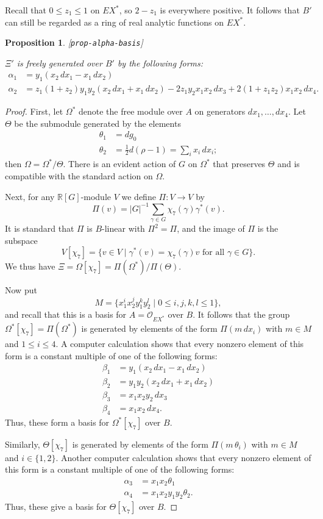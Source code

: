 \documentclass[reqno]{amsart}
\newcommand{\lbl}[1]{\label{#1}\textup{[\texttt{#1}]}\par}
\newcommand{\lbl}{\label}
\newcommand{\Tht}       {\Theta}
\newcommand{\Om}        {\Omega}
\newcommand{\al}        {\alpha}
\newcommand{\bt}        {\beta}
\newcommand{\gm}        {\gamma}
\newcommand{\tht}       {\theta}
\newcommand{\R}         {{\mathbb{R}}}
\newcommand{\st}        {\;|\;}
\newcommand{\half}      {\tfrac{1}{2}}
\newcommand{\CO}        {\mathcal{O}}
\renewcommand{\:}{\colon}
\newtheorem{proposition}[theorem]{Proposition}
\theoremstyle{definition}
\begin{document}
Recall that $0\leq z_1\leq 1$ on $EX^*$, so $2-z_1$ is everywhere
positive.  It follows that $B'$ can still be regarded as a ring of
real analytic functions on $EX^*$.

\begin{proposition}\lbl{prop-alpha-basis}
 $\Xi'$ is freely generated over $B'$ by the following forms:
 \begin{align*}
  \al_1 &= y_1(x_2\,dx_1-x_1\,dx_2) \\
  \al_2 &= z_1(1+z_2)y_1y_2(x_2\,dx_1+x_1\,dx_2)
            -2z_1y_2x_1x_2\,dx_3 + 2(1+z_1z_2)x_1x_2\,dx_4.
 \end{align*}
\end{proposition}
\begin{proof}
 First, let $\Om^*$ denote the free module over $A$ on generators
 $dx_1,\dotsc,dx_4$.  Let $\Tht$ be the submodule generated by the
 elements
 \begin{align*}
  \tht_1 &= dg_0 \\
  \tht_2 &= \half d(\rho-1) = \sum_ix_i\,dx_i;
 \end{align*}
 then $\Om=\Om^*/\Tht$.  There is an evident action of $G$ on $\Om^*$
 that preserves $\Tht$ and is compatible with the standard action on
 $\Om$.

 Next, for any $\R[G]$-module $V$ we define $\Pi\:V\to V$ by
 \[ \Pi(v)=|G|^{-1}\sum_{\gm\in G} \chi_7(\gm)\gm^*(v). \]
 It is standard that $\Pi$ is $B$-linear with $\Pi^2=\Pi$, and the
 image of $\Pi$ is the subspace
 \[ V[\chi_7] = \{v\in V\st \gm^*(v)  = \chi_7(\gm)v
                   \text{ for all } \gm\in G\}.
 \]
 We thus have $\Xi=\Om[\chi_7]=\Pi(\Om^*)/\Pi(\Tht)$.

 Now put
 \[ M = \{x_1^ix_2^jy_1^ky_2^l\st 0\leq i,j,k,l \leq 1\}, \]
 and recall that this is a basis for $A=\CO_{EX^*}$ over $B$.  It follows
 that the group $\Om^*[\chi_7]=\Pi(\Om^*)$ is generated by elements of the
 form $\Pi(m\,dx_i)$ with $m\in M$ and $1\leq i\leq 4$.  A computer
 calculation shows that every nonzero element of this form is a
 constant multiple of one of the following forms:
 \begin{align*}
  \bt_1 &= y_1(x_2\,dx_1 - x_1\,dx_2) \\
  \bt_2 &= y_1y_2(x_2\,dx_1 + x_1\,dx_2) \\
  \bt_3 &= x_1x_2y_2\,dx_3 \\
  \bt_4 &= x_1x_2\,dx_4.
 \end{align*}
 Thus, these form a basis for $\Om^*[\chi_7]$ over $B$.

 Similarly, $\Tht[\chi_7]$ is generated by elements of the form
 $\Pi(m\,\tht_i)$ with $m\in M$ and $i\in\{1,2\}$.  Another computer
 calculation shows that every nonzero element of this form is a
 constant multiple of one of the following forms:
 \begin{align*}
  \al_3 &= x_1x_2\tht_1 \\
  \al_4 &= x_1x_2y_1y_2\tht_2.
 \end{align*}
 Thus, these give a basis for $\Tht[\chi_7]$ over $B$.


\end{proof}
\end{document}
